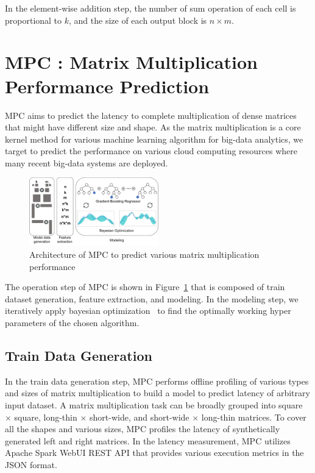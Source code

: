 \documentclass[10pt, conference, compsocconf]{IEEEtran}
\begin{document}
In the element-wise addition step, the number of sum operation of each cell is proportional to $k$, and the size of each output block is $n \times m$.

\section{MPC : Matrix Multiplication Performance Prediction}\label{sec:mpc-structure}
MPC aims to predict the latency to complete multiplication of dense matrices that might have different size and shape. As the matrix multiplication is a core kernel method for various machine learning algorithm for big-data analytics, we target to predict the performance on various cloud computing resources where many recent big-data systems are deployed.

\begin{figure}
  \centering\includegraphics[width=0.5\textwidth]{figures/mpc-architecture.pdf}\caption{Architecture of MPC to predict various matrix multiplication performance}\label{fig:mpc-architecture}
\end{figure}

The operation step of MPC is shown in Figure~\ref{fig:mpc-architecture} that is composed of train dataset generation, feature extraction, and modeling. In the modeling step, we iteratively apply bayesian optimization~\cite{bayesian-optimization} to find the optimally working hyper parameters of the chosen algorithm.

\subsection{Train Data Generation}\label{sec:train-data}
In the train data generation step, MPC performs offline profiling of various types and sizes of matrix multiplication to build a model to predict latency of arbitrary input dataset. A matrix multiplication task can be broadly grouped into square $\times$ square, long-thin $\times$ short-wide, and short-wide $\times$ long-thin matrices. To cover all the shapes and various sizes, MPC profiles the latency of synthetically generated left and right matrices. In the latency measurement, MPC utilizes Apache Spark WebUI REST API that provides various execution metrics in the JSON format.
\end{document}
